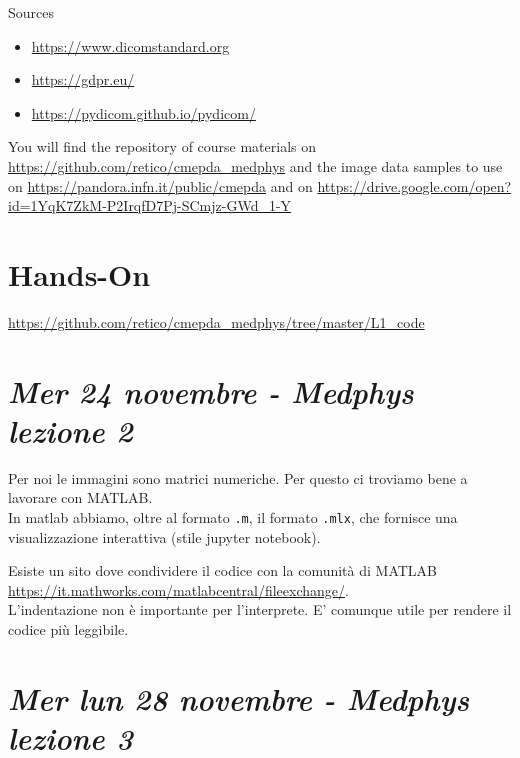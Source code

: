 Sources
\begin{itemize}
	\item \url{https://www.dicomstandard.org}
	\item \url{https://gdpr.eu/}
	\item\url{https://pydicom.github.io/pydicom/}
\end{itemize}

You will find the repository of course materials on \url{https://github.com/retico/cmepda_medphys}
and the image data samples to use on \url{https://pandora.infn.it/public/cmepda}
and on \url{https://drive.google.com/open?id=1YqK7ZkM-P2IrqfD7Pj-SCmjz-GWd_1-Y}

\section{Hands-On}

\url{https://github.com/retico/cmepda_medphys/tree/master/L1_code}

\newpage

\section{\textit{Mer 24 novembre - Medphys lezione 2}}

Per noi le immagini sono matrici numeriche. Per questo ci troviamo bene a lavorare con MATLAB.\\

In matlab abbiamo, oltre al formato \texttt{.m}, il formato \texttt{.mlx}, che fornisce una visualizzazione interattiva (stile jupyter notebook).

Esiste un sito dove condividere il codice con la comunità di MATLAB \url{https://it.mathworks.com/matlabcentral/fileexchange/}.\\

L'indentazione non è importante per l'interprete. E' comunque utile per rendere il codice più leggibile.

\newpage

\section{\textit{Mer lun 28 novembre - Medphys lezione 3}}